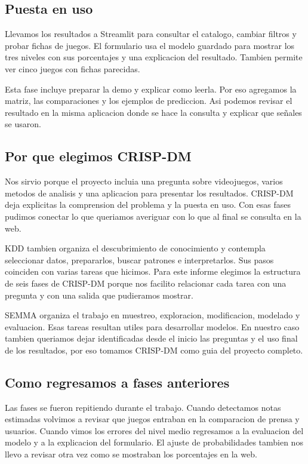 \subsection{Puesta en uso}
Llevamos los resultados a Streamlit para consultar el catalogo, cambiar filtros y probar fichas de juegos. El formulario usa el modelo guardado para mostrar los tres niveles con sus porcentajes y una explicacion del resultado. Tambien permite ver cinco juegos con fichas parecidas.

Esta fase incluye preparar la demo y explicar como leerla. Por eso agregamos la matriz, las comparaciones y los ejemplos de prediccion. Asi podemos revisar el resultado en la misma aplicacion donde se hace la consulta y explicar que señales se usaron.

\subsection{Por que elegimos CRISP-DM}
Nos sirvio porque el proyecto incluia una pregunta sobre videojuegos, varios metodos de analisis y una aplicacion para presentar los resultados. CRISP-DM deja explicitas la comprension del problema y la puesta en uso. Con esas fases pudimos conectar lo que queriamos averiguar con lo que al final se consulta en la web.

KDD tambien organiza el descubrimiento de conocimiento y contempla seleccionar datos, prepararlos, buscar patrones e interpretarlos. Sus pasos coinciden con varias tareas que hicimos. Para este informe elegimos la estructura de seis fases de CRISP-DM porque nos facilito relacionar cada tarea con una pregunta y con una salida que pudieramos mostrar.

SEMMA organiza el trabajo en muestreo, exploracion, modificacion, modelado y evaluacion. Esas tareas resultan utiles para desarrollar modelos. En nuestro caso tambien queriamos dejar identificadas desde el inicio las preguntas y el uso final de los resultados, por eso tomamos CRISP-DM como guia del proyecto completo.

\subsection{Como regresamos a fases anteriores}
Las fases se fueron repitiendo durante el trabajo. Cuando detectamos notas estimadas volvimos a revisar que juegos entraban en la comparacion de prensa y usuarios. Cuando vimos los errores del nivel medio regresamos a la evaluacion del modelo y a la explicacion del formulario. El ajuste de probabilidades tambien nos llevo a revisar otra vez como se mostraban los porcentajes en la web.

